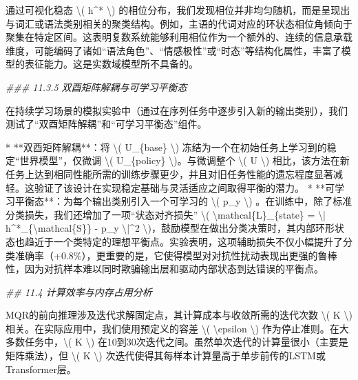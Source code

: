 \documentclass[
  12pt,
]{article}
\newenvironment{Shaded}{}{}
\newcommand{\CommentTok}[1]{\textcolor[rgb]{0.38,0.63,0.69}{\textit{#1}}}
\newcommand{\DecValTok}[1]{\textcolor[rgb]{0.25,0.63,0.44}{#1}}
\newcommand{\FloatTok}[1]{\textcolor[rgb]{0.25,0.63,0.44}{#1}}
\newcommand{\NormalTok}[1]{#1}
\newcommand{\OperatorTok}[1]{\textcolor[rgb]{0.40,0.40,0.40}{#1}}
\begin{document}
\begin{Shaded}
\begin{Highlighting}[]
\NormalTok{通过可视化稳态 }\OperatorTok{\textbackslash{}}\NormalTok{( h}\OperatorTok{\^{}*} \OperatorTok{\textbackslash{}}\NormalTok{) 的相位分布，我们发现相位并非均匀随机，而是呈现出与词汇或语法类别相关的聚类结构。例如，主语的代词对应的环状态相位角倾向于聚集在特定区间。这表明复数系统能够利用相位作为一个额外的、连续的信息承载维度，可能编码了诸如“语法角色”、“情感极性”或“时态”等结构化属性，丰富了模型的表征能力。这是实数域模型所不具备的。}

\CommentTok{\#\#\# 11.3.5 双酉矩阵解耦与可学习平衡态}

\NormalTok{在持续学习场景的模拟实验中（通过在序列任务中逐步引入新的输出类别），我们测试了“双酉矩阵解耦”和“可学习平衡态”组件。}

\OperatorTok{*}   \OperatorTok{**}\NormalTok{双酉矩阵解耦}\OperatorTok{**}\NormalTok{：将 }\OperatorTok{\textbackslash{}}\NormalTok{( U\_\{base\} }\OperatorTok{\textbackslash{}}\NormalTok{) 冻结为一个在初始任务上学习到的稳定“世界模型”，仅微调 }\OperatorTok{\textbackslash{}}\NormalTok{( U\_\{policy\} }\OperatorTok{\textbackslash{}}\NormalTok{)。与微调整个 }\OperatorTok{\textbackslash{}}\NormalTok{( U }\OperatorTok{\textbackslash{}}\NormalTok{) 相比，该方法在新任务上达到相同性能所需的训练步骤更少，并且对旧任务性能的遗忘程度显著减轻。这验证了该设计在实现稳定基础与灵活适应之间取得平衡的潜力。}
\OperatorTok{*}   \OperatorTok{**}\NormalTok{可学习平衡态}\OperatorTok{**}\NormalTok{：为每个输出类别引入一个可学习的 }\OperatorTok{\textbackslash{}}\NormalTok{( p\_y }\OperatorTok{\textbackslash{}}\NormalTok{) 。在训练中，除了标准分类损失，我们还增加了一项“状态对齐损失” }\OperatorTok{\textbackslash{}}\NormalTok{( }\OperatorTok{\textbackslash{}}\NormalTok{mathcal\{L\}\_\{state\} }\OperatorTok{=} \OperatorTok{\textbackslash{}|}\NormalTok{ h}\OperatorTok{\^{}*}\NormalTok{\_\{}\OperatorTok{\textbackslash{}}\NormalTok{mathcal\{S\}\} }\OperatorTok{{-}}\NormalTok{ p\_y }\OperatorTok{\textbackslash{}|\^{}}\DecValTok{2} \OperatorTok{\textbackslash{}}\NormalTok{)，鼓励模型在做出分类决策时，其内部环形状态也趋近于一个类特定的理想平衡点。实验表明，这项辅助损失不仅小幅提升了分类准确率（}\OperatorTok{+}\FloatTok{0.8}\OperatorTok{\%}\NormalTok{），更重要的是，它使得模型对对抗性扰动表现出更强的鲁棒性，因为对抗样本难以同时欺骗输出层和驱动内部状态到达错误的平衡点。}

\CommentTok{\#\# 11.4 计算效率与内存占用分析}

\NormalTok{MQR的前向推理涉及迭代求解固定点，其计算成本与收敛所需的迭代次数 }\OperatorTok{\textbackslash{}}\NormalTok{( K }\OperatorTok{\textbackslash{}}\NormalTok{) 相关。在实际应用中，我们使用预定义的容差 }\OperatorTok{\textbackslash{}}\NormalTok{( }\OperatorTok{\textbackslash{}}\NormalTok{epsilon }\OperatorTok{\textbackslash{}}\NormalTok{) 作为停止准则。在大多数任务中，}\OperatorTok{\textbackslash{}}\NormalTok{( K }\OperatorTok{\textbackslash{}}\NormalTok{) 在}\DecValTok{10}\NormalTok{到}\DecValTok{30}\NormalTok{次迭代之间。虽然单次迭代的计算量很小（主要是矩阵乘法），但 }\OperatorTok{\textbackslash{}}\NormalTok{( K }\OperatorTok{\textbackslash{}}\NormalTok{) 次迭代使得其每样本计算量高于单步前传的LSTM或Transformer层。}


\end{Highlighting}
\end{Shaded}
\end{document}
